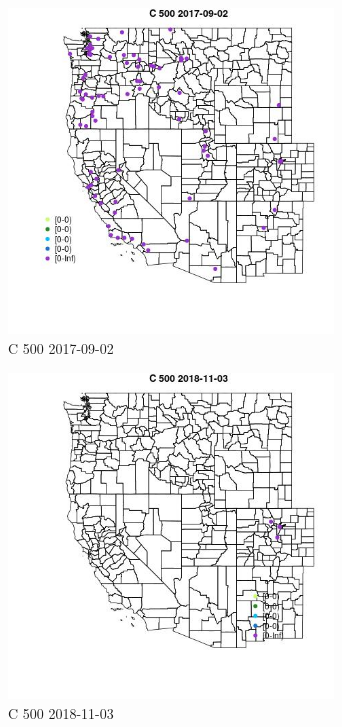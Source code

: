 \begin{figure} 
\centering  
\includegraphics[width=0.77\textwidth]{Code_Outputs/Report_ML_input_PM25_Step4_part_e_de_duplicated_aveswNAs_MapObsC_5002017-09-02.jpg} 
\caption{\label{fig:Report_ML_input_PM25_Step4_part_e_de_duplicated_aveswNAsMapObsC_5002017-09-02}C 500 2017-09-02} 
\end{figure} 
 

\begin{figure} 
\centering  
\includegraphics[width=0.77\textwidth]{Code_Outputs/Report_ML_input_PM25_Step4_part_e_de_duplicated_aveswNAs_MapObsC_5002018-11-03.jpg} 
\caption{\label{fig:Report_ML_input_PM25_Step4_part_e_de_duplicated_aveswNAsMapObsC_5002018-11-03}C 500 2018-11-03} 
\end{figure} 
 

